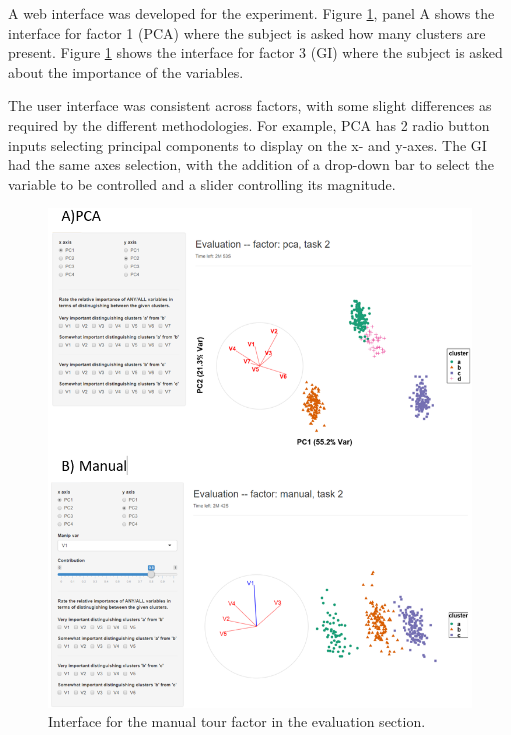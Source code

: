 \documentclass[
  11,
]{article}
\begin{document}
A web interface was developed for the experiment. Figure \ref{fig:appInterface}, panel A shows the interface for factor 1 (PCA) where the subject is asked how many clusters are present. Figure \ref{fig:appInterface} shows the interface for factor 3 (GI) where the subject is asked about the importance of the variables.

The user interface was consistent across factors, with some slight differences as required by the different methodologies. For example, PCA has 2 radio button inputs selecting principal components to display on the x- and y-axes. The GI had the same axes selection, with the addition of a drop-down bar to select the variable to be controlled and a slider controlling its magnitude.

\begin{figure}[h]

{\centering \includegraphics[width=1\linewidth,]{./figures/appInterface} 

}

\caption{Interface for the manual tour factor in the evaluation section.}\label{fig:appInterface}
\end{figure}
\end{document}
